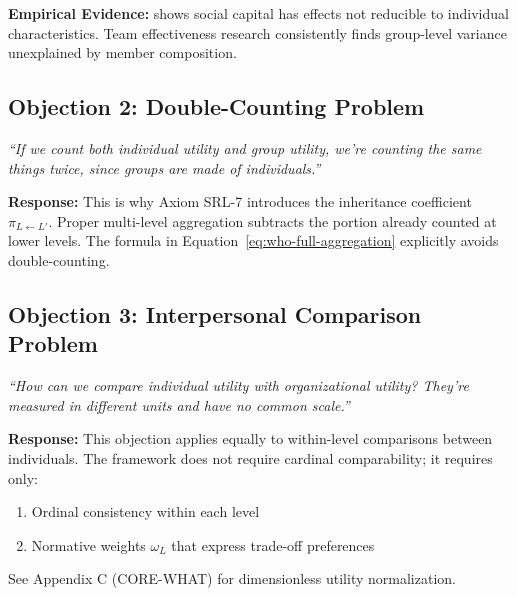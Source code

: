 \textbf{Empirical Evidence:}
\citet{putnam2000bowling} shows social capital has effects not reducible
to individual characteristics. Team effectiveness research consistently
finds group-level variance unexplained by member composition.

\subsection{Objection 2: Double-Counting Problem}

\begin{tcolorbox}[colback=red!5!white, colframe=red!50!black,
    title=Objection: Multi-Level Aggregation Double-Counts]
\textit{``If we count both individual utility and group utility, we're counting
the same things twice, since groups are made of individuals.''}
\end{tcolorbox}

\textbf{Response:}
This is why Axiom SRL-7 introduces the inheritance coefficient $\pi_{L \leftarrow L'}$.
Proper multi-level aggregation subtracts the portion already counted at lower levels.
The formula in Equation~\ref{eq:who-full-aggregation} explicitly avoids double-counting.

\subsection{Objection 3: Interpersonal Comparison Problem}

\begin{tcolorbox}[colback=red!5!white, colframe=red!50!black,
    title=Objection: Cross-Level Comparison is Meaningless]
\textit{``How can we compare individual utility with organizational utility?
They're measured in different units and have no common scale.''}
\end{tcolorbox}

\textbf{Response:}
This objection applies equally to within-level comparisons between individuals.
The framework does not require cardinal comparability; it requires only:
\begin{enumerate}
\item Ordinal consistency within each level
\item Normative weights $\omega_L$ that express trade-off preferences
\end{enumerate}

See Appendix C (CORE-WHAT) for dimensionless utility normalization.



